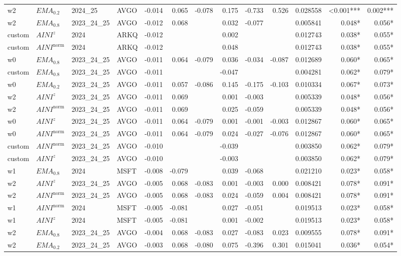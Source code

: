 \begin{longtable}{@{}llllrrrrrrrrr@{}}
w2 & $EMA_{0.2}$ & 2024\_25 & AVGO & -0.014 & 0.065 & -0.078 & 0.175 & -0.733 & 0.526 & 0.028558 & \textless{}0.001*** & 0.002*** \\
w2 & $EMA_{0.8}$ & 2023\_24\_25 & AVGO & -0.012 & 0.068 &  & 0.032 & -0.077 &  & 0.005841 & 0.048* & 0.056* \\
custom & $AINI^{z}$ & 2024 & ARKQ & -0.012 &  &  & 0.002 &  &  & 0.012743 & 0.038* & 0.055* \\
custom & $AINI^{\mathrm{norm}}$ & 2024 & ARKQ & -0.012 &  &  & 0.048 &  &  & 0.012743 & 0.038* & 0.055* \\
w0 & $EMA_{0.8}$ & 2023\_24\_25 & AVGO & -0.011 & 0.064 & -0.079 & 0.036 & -0.034 & -0.087 & 0.012689 & 0.060* & 0.065* \\
custom & $EMA_{0.8}$ & 2023\_24\_25 & AVGO & -0.011 &  &  & -0.047 &  &  & 0.004281 & 0.062* & 0.079* \\
w0 & $EMA_{0.2}$ & 2023\_24\_25 & AVGO & -0.011 & 0.057 & -0.086 & 0.145 & -0.175 & -0.103 & 0.010334 & 0.067* & 0.073* \\
w2 & $AINI^{z}$ & 2023\_24\_25 & AVGO & -0.011 & 0.069 &  & 0.001 & -0.003 &  & 0.005339 & 0.048* & 0.056* \\
w2 & $AINI^{\mathrm{norm}}$ & 2023\_24\_25 & AVGO & -0.011 & 0.069 &  & 0.025 & -0.059 &  & 0.005339 & 0.048* & 0.056* \\
w0 & $AINI^{z}$ & 2023\_24\_25 & AVGO & -0.011 & 0.064 & -0.079 & 0.001 & -0.001 & -0.003 & 0.012867 & 0.060* & 0.065* \\
w0 & $AINI^{\mathrm{norm}}$ & 2023\_24\_25 & AVGO & -0.011 & 0.064 & -0.079 & 0.024 & -0.027 & -0.076 & 0.012867 & 0.060* & 0.065* \\
custom & $AINI^{\mathrm{norm}}$ & 2023\_24\_25 & AVGO & -0.010 &  &  & -0.039 &  &  & 0.003850 & 0.062* & 0.079* \\
custom & $AINI^{z}$ & 2023\_24\_25 & AVGO & -0.010 &  &  & -0.003 &  &  & 0.003850 & 0.062* & 0.079* \\
w1 & $EMA_{0.8}$ & 2024 & MSFT & -0.008 & -0.079 &  & 0.039 & -0.068 &  & 0.021210 & 0.023* & 0.058* \\
w2 & $AINI^{z}$ & 2023\_24\_25 & AVGO & -0.005 & 0.068 & -0.083 & 0.001 & -0.003 & 0.000 & 0.008421 & 0.078* & 0.091* \\
w2 & $AINI^{\mathrm{norm}}$ & 2023\_24\_25 & AVGO & -0.005 & 0.068 & -0.083 & 0.024 & -0.059 & 0.004 & 0.008421 & 0.078* & 0.091* \\
w1 & $AINI^{\mathrm{norm}}$ & 2024 & MSFT & -0.005 & -0.081 &  & 0.027 & -0.051 &  & 0.019513 & 0.023* & 0.058* \\
w1 & $AINI^{z}$ & 2024 & MSFT & -0.005 & -0.081 &  & 0.001 & -0.002 &  & 0.019513 & 0.023* & 0.058* \\
w2 & $EMA_{0.8}$ & 2023\_24\_25 & AVGO & -0.004 & 0.068 & -0.083 & 0.027 & -0.083 & 0.023 & 0.009555 & 0.078* & 0.091* \\
w2 & $EMA_{0.2}$ & 2023\_24\_25 & AVGO & -0.003 & 0.068 & -0.080 & 0.075 & -0.396 & 0.301 & 0.015041 & 0.036* & 0.054* \\
\end{longtable}

